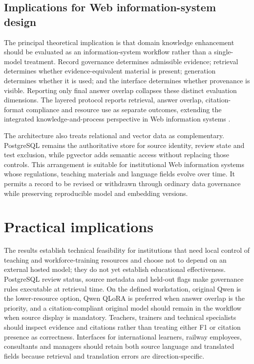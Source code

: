 \subsection{Implications for Web information-system design}

The principal theoretical implication is that domain knowledge enhancement should be evaluated as an information-system workflow rather than a single-model treatment. Record governance determines admissible evidence; retrieval determines whether evidence-equivalent material is present; generation determines whether it is used; and the interface determines whether provenance is visible. Reporting only final answer overlap collapses these distinct evaluation dimensions. The layered protocol reports retrieval, answer overlap, citation-format compliance and resource use as separate outcomes, extending the integrated knowledge-and-process perspective in Web information systems \citep{hubscher2021knowledge,yang2024legalqa}.

The architecture also treats relational and vector data as complementary. PostgreSQL remains the authoritative store for source identity, review state and test exclusion, while pgvector adds semantic access without replacing those controls. This arrangement is suitable for institutional Web information systems whose regulations, teaching materials and language fields evolve over time. It permits a record to be revised or withdrawn through ordinary data governance while preserving reproducible model and embedding versions.

\section{Practical implications}

The results establish technical feasibility for institutions that need local control of teaching and workforce-training resources and choose not to depend on an external hosted model; they do not yet establish educational effectiveness. PostgreSQL review status, source metadata and held-out flags make governance rules executable at retrieval time. On the defined workstation, original Qwen is the lower-resource option, Qwen QLoRA is preferred when answer overlap is the priority, and a citation-compliant original model should remain in the workflow when source display is mandatory. Teachers, trainers and technical specialists should inspect evidence and citations rather than treating either F1 or citation presence as correctness. Interfaces for international learners, railway employees, consultants and managers should retain both source language and translated fields because retrieval and translation errors are direction-specific.

